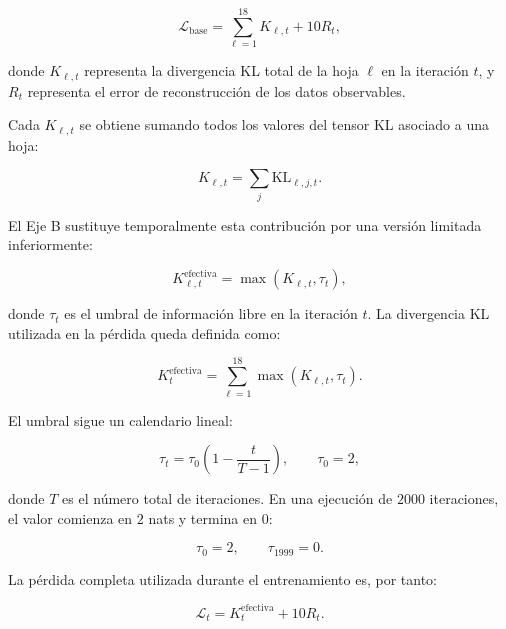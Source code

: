 \documentclass[11pt,a4paper,spanish]{book}
\numberwithin{equation}{chapter}
\numberwithin{figure}{chapter}
\begin{document}
\begin{equation}
\mathcal{L}_{\mathrm{base}} =
\sum_{\ell=1}^{18} K_{\ell,t}
+ 10 R_t,
\label{eq:eje-b-perdida-base}
\end{equation}

donde \(K_{\ell,t}\) representa la divergencia KL total de la hoja \(\ell\) en la iteración \(t\), y \(R_t\) representa el error de reconstrucción
de los datos observables.

Cada \(K_{\ell,t}\) se obtiene sumando todos los valores del tensor KL asociado a una hoja:

\begin{equation}
K_{\ell,t} =
\sum_{j} \mathrm{KL}_{\ell,j,t}.
\label{eq:eje-b-kl-hoja}
\end{equation}

El Eje B sustituye temporalmente esta contribución por una versión limitada inferiormente:

\begin{equation}
K^{\mathrm{efectiva}}_{\ell,t}
=
\max\left(K_{\ell,t},\tau_t\right),
\label{eq:eje-b-free-bits}
\end{equation}

donde \(\tau_t\) es el umbral de información libre en la iteración \(t\). La divergencia KL utilizada en la pérdida queda definida como:

\begin{equation}
K^{\mathrm{efectiva}}_t =
\sum_{\ell=1}^{18}
\max\left(K_{\ell,t},\tau_t\right).
\label{eq:eje-b-kl-efectiva}
\end{equation}

El umbral sigue un calendario lineal:

\begin{equation}
\tau_t =
\tau_0
\left(
1-\frac{t}{T-1}
\right),
\qquad
\tau_0=2,
\label{eq:eje-b-schedule}
\end{equation}

donde \(T\) es el número total de iteraciones. En una ejecución de \(2000\) iteraciones, el valor comienza en \(2\) nats y termina en \(0\):

\begin{equation}
\tau_0=2,
\qquad
\tau_{1999}=0.
\end{equation}

La pérdida completa utilizada durante el entrenamiento es, por tanto:

\begin{equation}
\mathcal{L}_t =
K^{\mathrm{efectiva}}_t
+ 10R_t.
\label{eq:eje-b-loss-final}
\end{equation}
\end{document}
